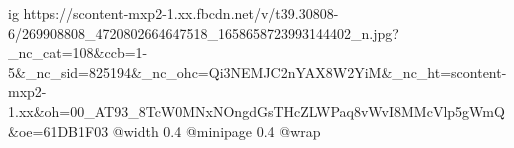  
 
 
 
 

\ifcmt
  ig https://scontent-mxp2-1.xx.fbcdn.net/v/t39.30808-6/269908808_4720802664647518_1658658723993144402_n.jpg?_nc_cat=108&ccb=1-5&_nc_sid=825194&_nc_ohc=Qi3NEMJC2nYAX8W2YiM&_nc_ht=scontent-mxp2-1.xx&oh=00_AT93_8TcW0MNxNOngdGsTHcZLWPaq8vWvI8MMcVlp5gWmQ&oe=61DB1F03
  @width 0.4
  @minipage 0.4
  @wrap \parpic[r]
\fi
